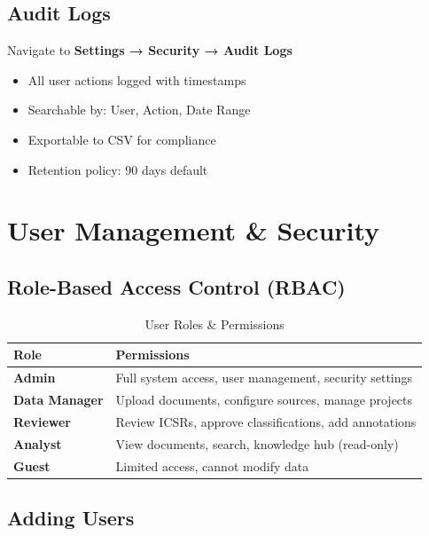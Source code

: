 \subsection{Audit Logs}

Navigate to \textbf{Settings → Security → Audit Logs}

\begin{itemize}
    \item All user actions logged with timestamps
    \item Searchable by: User, Action, Date Range
    \item Exportable to CSV for compliance
    \item Retention policy: 90 days default
\end{itemize}

\section{User Management \& Security}

\subsection{Role-Based Access Control (RBAC)}

\begin{table}[h]
\centering
\caption{User Roles \& Permissions}
\begin{tabularx}{\textwidth}{lX}
\toprule
\textbf{Role} & \textbf{Permissions} \\
\midrule
\textbf{Admin} & Full system access, user management, security settings \\
\textbf{Data Manager} & Upload documents, configure sources, manage projects \\
\textbf{Reviewer} & Review ICSRs, approve classifications, add annotations \\
\textbf{Analyst} & View documents, search, knowledge hub (read-only) \\
\textbf{Guest} & Limited access, cannot modify data \\
\bottomrule
\end{tabularx}
\end{table}

\subsection{Adding Users}


